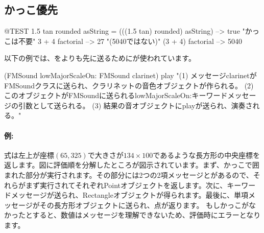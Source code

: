\documentclass[a4paper,10pt,twoside]{book}
\begin{document}
\subsection{かっこ優先}


\begin{code}{@TEST}
1.5 tan rounded asString = (((1.5 tan) rounded) asString) --> true    "かっこは不要"
3 + 4 factorial   --> 27    "(5040ではない)"
(3 + 4) factorial --> 5040
\end{code}

以下の例では、をよりも先に送るためにが使われています。
\begin{code}{}
(FMSound lowMajorScaleOn: FMSound clarinet) play 
"(1) メッセージclarinetがFMSoundクラスに送られ、クラリネットの音色オブジェクトが作られる。
 (2) このオブジェクトがFMSoundに送られるlowMajorScaleOn:キーワードメッセージの引数として送られる。
 (3) 結果の音オブジェクトにplayが送られ、演奏される。"
\end{code}



\paragraph{例:}
式は左上が座標$(65, 325)$で大きさが$134{\times}100$であるような長方形の中央座標を返します。図に評価順を分解したところが図示されています。まず、かっこで囲まれた部分が実行されます。その部分には2つの2項メッセージとがあるので、それらがまず実行されてそれぞれPointオブジェクトを返します。次に、キーワードメッセージが送られ、Rectangleオブジェクトが得られます。最後に、単項メッセージがその長方形オブジェクトに送られ、点が返ります。
もしかっこがなかったとすると、数値はメッセージを理解できないため、評価時にエラーとなります。
\end{document}
